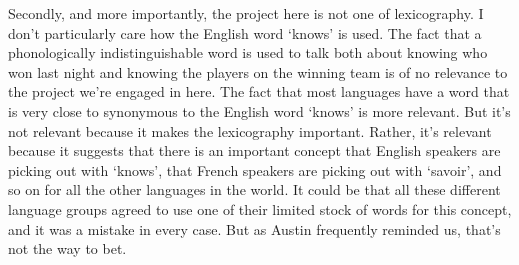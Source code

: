\documentclass[
  12pt,
  letterpaper,
]{scrbook}
\begin{document}
Secondly, and more importantly, the project here is not one of
lexicography. I don't particularly care how the English word `knows' is
used. The fact that a phonologically indistinguishable word is used to
talk both about knowing who won last night and knowing the players on
the winning team is of no relevance to the project we're engaged in
here. The fact that most languages have a word that is very close to
synonymous to the English word `knows' is more relevant. But it's not
relevant because it makes the lexicography important. Rather, it's
relevant because it suggests that there is an important concept that
English speakers are picking out with `knows', that French speakers are
picking out with `savoir', and so on for all the other languages in the
world. It could be that all these different language groups agreed to
use one of their limited stock of words for this concept, and it was a
mistake in every case. But as Austin frequently reminded us, that's not
the way to bet.
\end{document}
